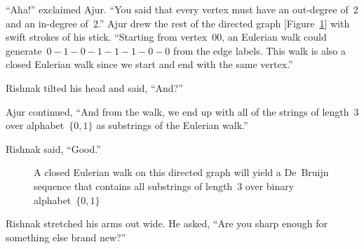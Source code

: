 ``Aha!'' exclaimed Ajur. ``You said that every vertex must have an out-degree of~2 and an in-degree of~2.''
Ajur drew the rest of the directed graph [Figure~\ref{4g6}] with swift strokes of his stick. ``Starting from vertex~$00$, an Eulerian walk could generate~$0-1-0-1-1-1-0-0$ from the edge labels. This walk is also a closed Eulerian walk since we start and end with the same vertex.''

Rishnak tilted his head and said, ``And?''

Ajur continued, ``And from the walk, we end up with all of the strings of length~3 over alphabet~$\{0,1\}$ as substrings of the Eulerian walk.''

Rishnak said, ``Good.''

\begin{figure}
\begin{center}
\caption{A closed Eulerian walk on this directed graph will yield a De~Bruijn sequence that contains all substrings of length~3 over binary alphabet~$\{0,1\}$}\label{4g6}
\end{center}
\end{figure}

Rishnak stretched his arms out wide. He asked, ``Are you sharp enough for something else brand new?''

